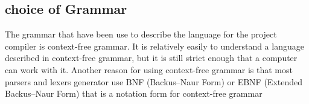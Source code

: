
\subsection{choice of Grammar}
The grammar that have been use to describe the language for the  project compiler is context-free grammar. It is relatively easily to understand a language described in context-free grammar, but it is still strict enough that a computer can work with it. Another reason for using context-free grammar is that most parsers and lexers generator use BNF (Backus–Naur Form) or EBNF (Extended Backus–Naur Form) that is a notation form for context-free grammar